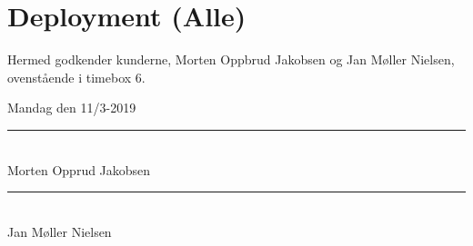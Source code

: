 \section{Deployment (Alle)}
\label{sec:deployment}

Hermed godkender kunderne, Morten Oppbrud Jakobsen og Jan Møller Nielsen, ovenstående i timebox 6.

Mandag den 11/3-2019

\begin{minipage}{.5\textwidth}
  \begin{center}
    \vspace{1.4cm}
    \rule{0.8\textwidth}{0.1pt}\\
    \small{Morten Opprud Jakobsen\\%
    }
  \end{center}
\end{minipage}%
\begin{minipage}{0.5\textwidth}
  \begin{center}
    \vspace{1.4cm}
    \rule{0.8\textwidth}{0.1pt}\\
    \small{Jan Møller Nielsen\\%
    }
  \end{center}
\end{minipage}

